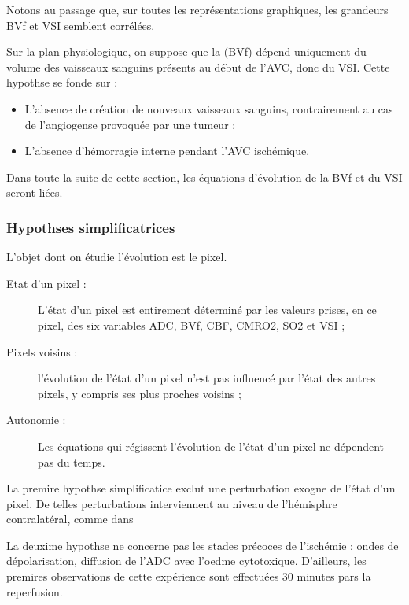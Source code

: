 \par
Notons au passage que, sur toutes les repr\'esentations graphiques, les grandeurs BVf et VSI semblent corr\'el\'ees.

\par
Sur la plan physiologique, on suppose que la (BVf) d\'epend uniquement du volume %
des vaisseaux sanguins pr\'esents au d\'ebut de l'AVC, donc du VSI. %
Cette hypothse se fonde sur :
\begin{itemize}
\item L'absence de cr\'eation de nouveaux vaisseaux sanguins, contrairement au cas de l'angiogense provoqu\'ee par une tumeur ;
\item L'absence d'h\'emorragie interne pendant l'AVC isch\'emique.
\end{itemize}

\par
Dans toute la suite de cette section, les \'equations d'\'evolution de la BVf et du VSI seront li\'ees.

\subsubsection{Hypothses simplificatrices}

L'objet dont on \'etudie l'\'evolution est le pixel.
\begin{description}
\item[Etat d'un pixel :] L'\'etat d'un pixel est entirement d\'etermin\'e par les valeurs prises, en ce pixel, des six variables ADC, BVf, CBF, CMRO2, SO2 et VSI ;
\item[Pixels voisins :] l'\'evolution de l'\'etat d'un pixel n'est pas influenc\'e par l'\'etat des autres pixels, y compris ses plus proches voisins ;
\item[Autonomie :] Les \'equations qui r\'egissent l'\'evolution de l'\'etat d'un pixel ne d\'ependent pas du temps.
\end{description}

La premire hypothse simplificatice exclut une perturbation exogne de l'\'etat d'un pixel. %
De telles perturbations interviennent au niveau de l'h\'emisphre contralat\'eral, comme dans 

\par
La deuxime hypothse ne concerne pas les stades pr\'ecoces de l'isch\'emie : ondes de d\'epolarisation, diffusion de l'ADC avec l'oedme cytotoxique. %
D'ailleurs, les premires observations de cette exp\'erience sont effectu\'ees 30 minutes pars la reperfusion.

